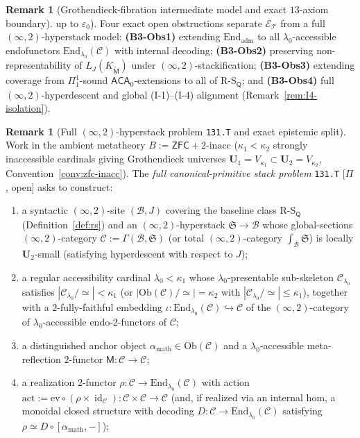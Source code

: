 \documentclass[11pt]{article}
\theoremstyle{plain}
\theoremstyle{definition}
\newtheorem{remark}[theorem]{Remark}
\newcommand{\RS}{\mathrm{R\text{-}S}}
\newcommand{\cC}{\mathcal{C}}
\newcommand{\Ob}{\mathrm{Ob}}
\newcommand{\ZFC}{\mathsf{ZFC}}
\DeclareMathOperator{\id}{id}
\begin{document}
\begin{remark}[Grothendieck-fibration intermediate model and exact $13$-axiom boundary]
up to $\varepsilon_0$). Four exact open obstructions separate $\mathcal{E}_{\mathcal{T}}$ from a full $(\infty, 2)$-hyperstack model: \textbf{(B3-Obs1)} extending $\mathrm{End}_{\mathrm{adm}}$ to all $\lambda_0$-accessible endofunctors $\mathrm{End}_{\lambda_0}(\cC)$ with internal decoding; \textbf{(B3-Obs2)} preserving non-representability of $L_J(K_{\widetilde{\mathsf{M}}})$ under $(\infty, 2)$-stackification; \textbf{(B3-Obs3)} extending coverage from $\Pi_1^1$-sound $\mathsf{ACA}_0$-extensions to all of $\RS_{\mathsf{Q}}$; and \textbf{(B3-Obs4)} full $(\infty, 2)$-hyperdescent and global (I-1)--(I-4) alignment (Remark~\ref{rem:I4-isolation}).
\end{remark}

\begin{remark}[Full $(\infty,2)$-hyperstack problem \texttt{131.T} and exact epistemic split]\label{prob:131T}
Work in the ambient metatheory $B := \ZFC + 2\text{-}\mathrm{inacc}$ ($\kappa_1 < \kappa_2$ strongly inaccessible cardinals giving Grothendieck universes $\mathbf{U}_1 = V_{\kappa_1} \subset \mathbf{U}_2 = V_{\kappa_2}$, Convention~\ref{conv:zfc-inacc}). The \emph{full canonical-primitive stack problem} \texttt{131.T} \textup{[\textbf{$\Pi$}, open]} asks to construct:
\begin{enumerate}[nosep,label=(\arabic*)]
\item a syntactic $(\infty,2)$-site $(\mathcal{B}, J)$ covering the baseline class $\RS_{\mathsf{Q}}$ (Definition~\ref{def:rs}) and an $(\infty,2)$-hyperstack $\mathfrak{S} \to \mathcal{B}$ whose global-sections $(\infty,2)$-category $\cC := \Gamma(\mathcal{B}, \mathfrak{S})$ (or total $(\infty,2)$-category $\int_{\mathcal{B}} \mathfrak{S}$) is locally $\mathbf{U}_2$-small (satisfying hyperdescent with respect to $J$);
\item a regular accessibility cardinal $\lambda_0 < \kappa_1$ whose $\lambda_0$-presentable sub-skeleton $\cC_{\lambda_0}$ satisfies $|\cC_{\lambda_0}/\!\simeq| < \kappa_1$ (or $|\Ob(\cC)/\!\simeq| = \kappa_2$ with $|\cC_{\lambda_0}/\!\simeq| \le \kappa_1$), together with a $2$-fully-faithful embedding $\iota : \mathrm{End}_{\lambda_0}(\cC) \hookrightarrow \cC$ of the $(\infty,2)$-category of $\lambda_0$-accessible endo-$2$-functors of $\cC$;
\item a distinguished anchor object $\alpha_{\mathrm{math}} \in \Ob(\cC)$ and a $\lambda_0$-accessible meta-reflection $2$-functor $\mathsf{M} : \cC \to \cC$;
\item a realization $2$-functor $\rho : \cC \to \mathrm{End}_{\lambda_0}(\cC)$ with action $\mathrm{act} := \mathrm{ev} \circ (\rho \times \id_{\cC}) : \cC \times \cC \to \cC$ (and, if realized via an internal hom, a monoidal closed structure with decoding $D : \cC \to \mathrm{End}_{\lambda_0}(\cC)$ satisfying $\rho \simeq D \circ [\alpha_{\mathrm{math}}, -]$);

\end{enumerate}
\end{remark}
\end{document}
